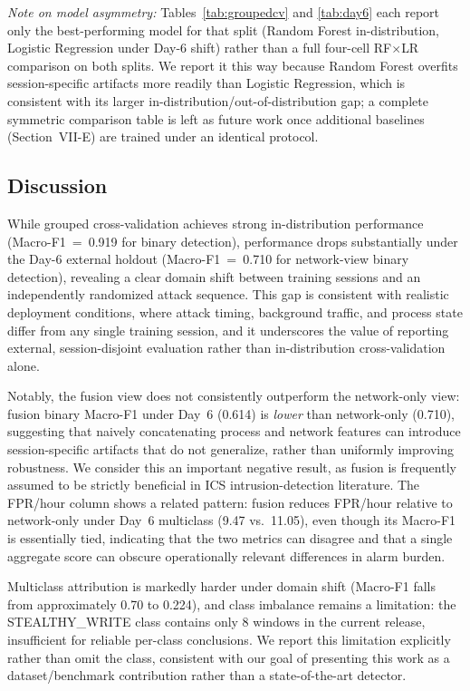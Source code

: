 \documentclass[conference]{IEEEtran}
\begin{document}
\emph{Note on model asymmetry:} Tables~\ref{tab:groupedcv} and \ref{tab:day6} each report only the best-performing model for that split (Random Forest in-distribution, Logistic Regression under Day-6 shift) rather than a full four-cell RF$\times$LR comparison on both splits. We report it this way because Random Forest overfits session-specific artifacts more readily than Logistic Regression, which is consistent with its larger in-distribution/out-of-distribution gap; a complete symmetric comparison table is left as future work once additional baselines (Section~VII-E) are trained under an identical protocol.

\subsection{Discussion}
While grouped cross-validation achieves strong in-distribution performance (Macro-F1~=~0.919 for binary detection), performance drops substantially under the Day-6 external holdout (Macro-F1~=~0.710 for network-view binary detection), revealing a clear domain shift between training sessions and an independently randomized attack sequence. This gap is consistent with realistic deployment conditions, where attack timing, background traffic, and process state differ from any single training session, and it underscores the value of reporting external, session-disjoint evaluation rather than in-distribution cross-validation alone.

Notably, the fusion view does not consistently outperform the network-only view: fusion binary Macro-F1 under Day~6 (0.614) is \emph{lower} than network-only (0.710), suggesting that naively concatenating process and network features can introduce session-specific artifacts that do not generalize, rather than uniformly improving robustness. We consider this an important negative result, as fusion is frequently assumed to be strictly beneficial in ICS intrusion-detection literature. The FPR/hour column shows a related pattern: fusion reduces FPR/hour relative to network-only under Day~6 multiclass (9.47 vs.\ 11.05), even though its Macro-F1 is essentially tied, indicating that the two metrics can disagree and that a single aggregate score can obscure operationally relevant differences in alarm burden.

Multiclass attribution is markedly harder under domain shift (Macro-F1 falls from approximately 0.70 to 0.224), and class imbalance remains a limitation: the STEALTHY\_WRITE class contains only 8 windows in the current release, insufficient for reliable per-class conclusions. We report this limitation explicitly rather than omit the class, consistent with our goal of presenting this work as a dataset/benchmark contribution rather than a state-of-the-art detector.
\end{document}
